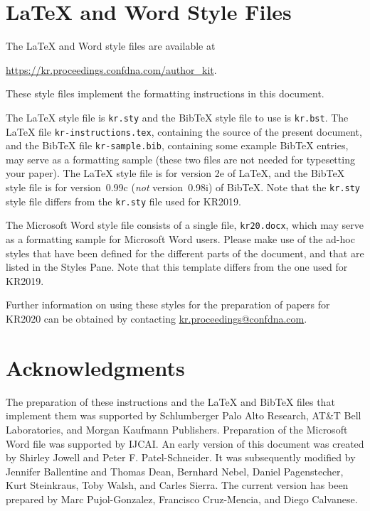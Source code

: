 \documentclass{article}
\begin{document}
\section{\LaTeX{} and Word Style Files}
\label{stylefiles}

The \LaTeX{} and Word style files are available at
\begin{center}
  \url{https://kr.proceedings.confdna.com/author_kit}.
\end{center}
These style files implement the formatting instructions in this document.

The \LaTeX{} style file is \texttt{kr.sty} and the Bib\TeX{} style file to use
is \texttt{kr.bst}.  The \LaTeX{} file \texttt{kr-instructions.tex}, containing
the source of the present document, and the Bib\TeX{} file
\texttt{kr-sample.bib}, containing some example Bib\TeX{} entries, may serve as
a formatting sample (these two files are not needed for typesetting your
paper).  The \LaTeX{} style file is for version 2e of \LaTeX{}, and the
Bib\TeX{} style file is for version~0.99c (\emph{not} version~0.98i) of
Bib\TeX{}.  Note that the \texttt{kr.sty} style file differs from the
\texttt{kr.sty} file used for KR2019.

The Microsoft Word style file consists of a single file, \texttt{kr20.docx},
which may serve as a formatting sample for Microsoft Word users.  Please make
use of the ad-hoc styles that have been defined for the different parts of the
document, and that are listed in the Styles Pane.  Note that this template
differs from the one used for KR2019.

Further information on using these styles for the preparation of papers for
KR2020 can be obtained by contacting
\href{mailto:kr.proceedings@confdna.com}{kr.proceedings@confdna.com}.

\section*{Acknowledgments}

The preparation of these instructions and the \LaTeX{} and Bib\TeX{}
files that implement them was supported by Schlumberger Palo Alto
Research, AT\&T Bell Laboratories, and Morgan Kaufmann Publishers.
Preparation of the Microsoft Word file was supported by IJCAI.  An
early version of this document was created by Shirley Jowell and Peter
F. Patel-Schneider.  It was subsequently modified by Jennifer
Ballentine and Thomas Dean, Bernhard Nebel, Daniel Pagenstecher,
Kurt Steinkraus, Toby Walsh, and Carles Sierra. The current version
has been prepared by Marc Pujol-Gonzalez, Francisco Cruz-Mencia, and Diego
Calvanese.




\end{document}
